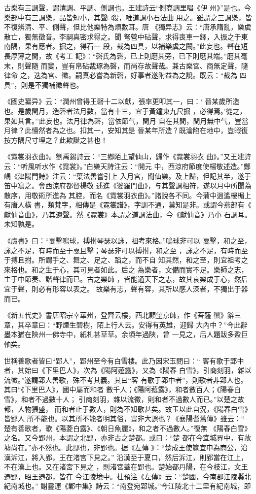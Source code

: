 \documentclass{ctexart}
\begin{document}
古樂有三調聲，謂清調、平調、側調也。王建詩云``側商調里唱《伊 州》''是也。今樂部中有三調樂，品皆短小，其聲□殺，唯道調小石法曲 用之。雖謂之三調樂，皆不復辨清、平、側聲，但比他樂特為煩數耳。唐 《獨异志》云：``唐承隋亂，樂虡散亡，獨無徵音。李嗣真密求得之。聞 弩營中砧聲，求得喪車一鐸，入振之于東南隅，果有應者。掘之，得石一 段，裁為四具，以補樂虡之闕。''此妄也。聲在短長厚薄之間，故《考工 記》：``磬氏為磬，已上則磨其旁，已下則磨其端。''磨其毫末，則聲隨 而變，豈有帛砧裁琢為磬，而尚存故聲哉。兼古樂宮、商無定聲，隨律命 之，迭為宮、徵。嗣真必嘗為新磬，好事者遂附益為之說。既云：``裁為 四具''，則是不獨補徵聲也。

《國史纂异》云：``潤州曾得王磬十二以獻，張率更叩其一，曰：` 晉某歲所造也。是歲閏月，造磬者法月數，當有十三，宜于黃鐘東九尺掘 ，必得焉。'從之，果如其言。''此妄也。法月律為磬，當依節气，閏月 自在其間，閏月無中气，豈當月律？此懵然者為之也。扣其一，安知其是 晉某年所造？既淪陷在地中，豈暇復按方隅尺寸埋之？此欺誕之甚也！

《霓裳羽衣曲》。劉禹錫詩云：``三鄉陌上望仙山，歸作《霓裳羽衣 曲》。''又王建詩云：``听風听水作《霓裳》。''白樂天詩注云：``開元 中，西涼府節度使楊敬述造。''鄭嵎《津陽門詩》注云：``葉法善嘗引上 入月宮，聞仙樂。及上歸，但記其半，遂于笛中寫之。會西涼府都督楊敬 述進《婆羅門曲》，与其聲調相符，遂以月中所聞為散序，用敬術所進為 其腔，而名《霓裳羽衣曲》。''諸說各不同。今蒲中逍遙樓楣上有唐人橫 書，類梵字，相傳是《霓裳譜》，字訓不通，莫知是非。或謂今燕部有《 獻仙音曲》，乃其遺聲。然《霓裳》本謂之道調法曲，今《獻仙音》乃小 石調耳。未知孰是。

《虞書》曰：``戛擊鳴球，搏拊琴瑟以詠，祖考來格。''鳴球非可以 戛擊，和之至，詠之不足，有時而至于戛且擊；琴瑟非可以搏拊，和之至 ，詠之不足，有時而至于搏且拊。所謂手之、舞之、足之、蹈之，而不自 知其然，和之至，則宜祖考之來格也。和之生于心，其可見者如此。后之 為樂者，文備而實不足。樂師之志，主于中節奏、諧聲律而已。古之樂師 ，皆能通天下之志，故其哀樂成于心，然后宜于聲，則必有形容以表之。 故樂有志，聲有容，其所以感人深者，不獨出于器而已。

《新五代史》書唐昭宗幸華州，登齊云樓，西北顧望京師，作《菩薩 蠻》辭三章，其卒章曰：``野煙生碧樹，陌上行人去。安得有英雄，迎歸 大內中？''今此辭墨本猶在陝州一佛寺中，紙札甚草草。余頃年過陝，曾 一見之，后人題跋多盈巨軸矣。

世稱善歌者皆曰``郢人''，郢州至今有白雪樓。此乃因宋玉問曰：`` 客有歌于郢中者，其始曰《下里巴人》，次為《陽阿薤露》，又為《陽春 白雪》，引商刻羽，雜以流徵。''遂謂郢人善歌，殊不考其義。其曰``客 有歌于郢中者''，則歌者非郢人也。其曰``《下里巴人》，國中屬而和者 數千人；《陽阿薤露》，和者數百人；《陽春白雪》，和者不過數十人； 引商刻羽，雜以流徵，則和者不過數人而已。''以楚之故都，人物猥盛， 而和者止于數人，則為不知歌甚矣。故玉以此自況，《陽春白雪》皆郢人 所不能也。以其所不能者明其俗，豈非大誤也？《襄陽耆舊傳》雖云：`` 楚有善歌者，歌《陽菱白露》、《朝日魚麗》，和之者不過數人。''復無 《陽春白雪》之名。又今郢州，本謂之北郢，亦非古之楚都。或曰：``楚 都在今宜城界中，有故墟尚在。''亦不然也。此鄢也，非郢也。据《左傳 》：``楚成王使籯宜申為商公，沿漢泝江，將入郢，王在渚宮下見之。'' 沿漢至于夏口，然后泝江，則郢當在江上，不在漢上也。又在渚宮下見之 ，則渚宮蓋在郢也。楚始都丹陽，在今枝江，文王遷郢，昭王遷都，皆在 今江陵境中。杜預注《左傳》云：``楚國，今南郡江陵縣北紀南城也。'' 謝靈運《鄴中集》詩云：``南登宛郢城。''今江陵北十二里有紀南城，即
\end{document}
